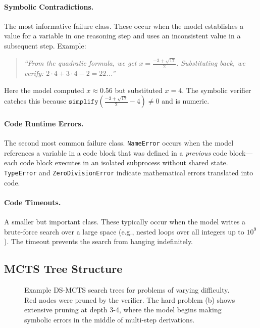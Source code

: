 \documentclass[11pt,a4paper]{article}
\begin{document}
\paragraph{Symbolic Contradictions.}
The most informative failure class. These occur when the model establishes a
value for a variable in one reasoning step and uses an inconsistent value in a
subsequent step. Example:

\begin{quote}
\textit{``From the quadratic formula, we get $x = \frac{-3 + \sqrt{17}}{2}$.
Substituting back, we verify: $2 \cdot 4 + 3 \cdot 4 - 2 = 22$...''}
\end{quote}

Here the model computed $x \approx 0.56$ but substituted $x = 4$. The symbolic
verifier catches this because
$\texttt{simplify}\left(\frac{-3+\sqrt{17}}{2} - 4\right) \neq 0$ and is
numeric.

\paragraph{Code Runtime Errors.}
The second most common failure class. \texttt{NameError} occurs when the model
references a variable in a code block that was defined in a \emph{previous}
code block---each code block executes in an isolated subprocess without shared
state. \texttt{TypeError} and \texttt{ZeroDivisionError} indicate mathematical
errors translated into code.

\paragraph{Code Timeouts.}
A smaller but important class. These typically occur when the model writes a
brute-force search over a large space (e.g., nested loops over all integers up
to $10^9$). The timeout prevents the search from hanging indefinitely.

\subsection{MCTS Tree Structure}

\begin{figure}[h]
\centering
\caption{Example DS-MCTS search trees for problems of varying difficulty.
Red nodes were pruned by the verifier. The hard problem (b) shows extensive
pruning at depth 3-4, where the model begins making symbolic errors in the
middle of multi-step derivations.}
\label{fig:trees}
\end{figure}
\end{document}

